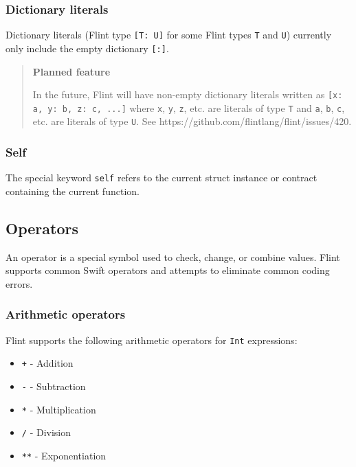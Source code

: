 \subsubsection{Dictionary literals}
\label{sec:appendix-b-dictionary-literals}

Dictionary literals (Flint type \texttt{[T: U]} for some Flint types \texttt{T} and \texttt{U}) currently only include the empty dictionary \texttt{[:]}.

\begin{quote}
\textbf{Planned feature}

In the future, Flint will have non-empty dictionary literals written as \texttt{[x: a, y: b, z: c, ...]} where \texttt{x}, \texttt{y}, \texttt{z}, etc. are literals of type \texttt{T} and \texttt{a}, \texttt{b}, \texttt{c}, etc. are literals of type \texttt{U}. See https://github.com/flintlang/flint/issues/420.
\end{quote}

\subsubsection{Self}
\label{sec:appendix-b-self}

The special keyword \texttt{self} refers to the current struct instance or contract containing the current function.

\subsection{Operators}
\label{sec:appendix-b-operators}

An operator is a special symbol used to check, change, or combine values. Flint supports common Swift operators and attempts to eliminate common coding errors.

\subsubsection{Arithmetic operators}
\label{sec:appendix-b-arithmetic-operators}

Flint supports the following arithmetic operators for \texttt{Int} expressions:

\begin{itemize}
	\item \texttt{+} - Addition
	\item \texttt{-} - Subtraction
	\item \texttt{*} - Multiplication
	\item \texttt{/} - Division
	\item \texttt{**} - Exponentiation
\end{itemize}

